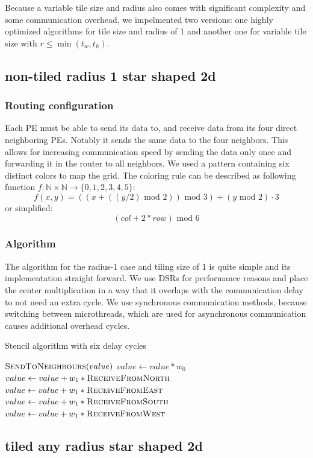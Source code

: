 \documentclass{article}
\newcommand{\m}{\text{ mod }}
\begin{document}
Because a variable tile size and radius also comes with significant complexity and some communication overhead, we impelmented two versions: one highly optimized algorithms for tile size and radius of 1 and another one for variable tile size with $r \leq \min(t_w, t_h)$.
\subsection{non-tiled radius 1 star shaped 2d}
\subsubsection{Routing configuration}
Each PE must be able to send its data to, and receive data from its four direct neighboring PEs. Notably it sends the same data to the four neighbors. This allows for increasing communication speed by sending the data only once and forwarding it in the router to all neighbors. We used a pattern containing six distinct colors to map the grid.
The coloring rule can be described as following function $f:\mathbb{N}\times\mathbb{N}\to\{0,1,2,3,4,5\}$:
$$f(x,y)=((x + ((y/2) \m 2)) \m 3) + (y \m 2)\cdot3$$
or simplified:
$$ (col + 2*row) \m 6$$
\subsubsection{Algorithm}
The algorithm for the radius-1 case and tiling size of 1 is quite simple and its implementation straight forward. We use DSRs for performance reasons and place the center multiplication in a way that it overlaps with the communication delay to not need an extra cycle. We use synchronous communication methods, because switching between microthreads, which are used for asynchronous communication causes additional overhead cycles. 
\begin{algorithm}
\caption{Stencil algorithm with six delay cycles}
\begin{algorithmic}[1]
\State $\Call{SendToNeighbours}{value}$
\State $value \gets value*w_0$
\State $value\gets value + w_1*\Call{ReceiveFromNorth}{}$
\State $value\gets value + w_1*\Call{ReceiveFromEast}{}$
\State $value\gets value + w_1*\Call{ReceiveFromSouth}{}$
\State $value\gets value + w_1*\Call{ReceiveFromWest}{}$
\EndProcedure
\end{algorithmic}
\end{algorithm}
\subsection{tiled any radius star shaped 2d}
\end{document}

